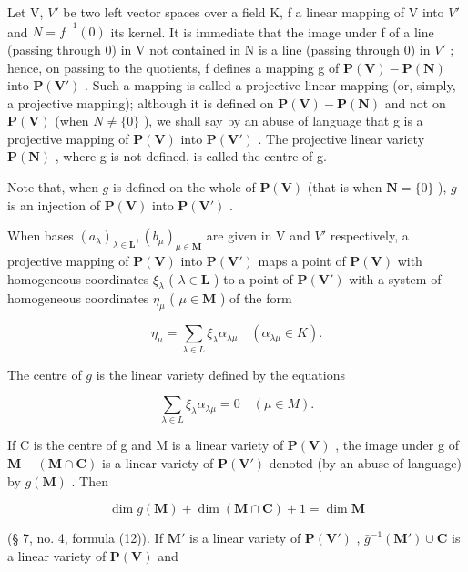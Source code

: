 Let V, \(V'\) be two left vector spaces over a field K, f a linear mapping of V into \(V'\) and \(N = \bar{f}^{-1}(0)\) its kernel. It is immediate that the image under f of a line (passing through 0) in V not contained in N is a line (passing through 0) in \(V'\) ; hence, on passing to the quotients, f defines a mapping g of \(\mathbf{P}(\mathbf{V}) - \mathbf{P}(\mathbf{N})\) into \(\mathbf{P}(\mathbf{V}')\) . Such a mapping is called a projective linear mapping (or, simply, a projective mapping); although it is defined on \(\mathbf{P}(\mathbf{V}) - \mathbf{P}(\mathbf{N})\) and not on \(\mathbf{P}(\mathbf{V})\) (when \(N \neq \{0\}\) ), we shall say by an abuse of language that g is a projective mapping of \(\mathbf{P}(\mathbf{V})\) into \(\mathbf{P}(\mathbf{V}')\) . The projective linear variety \(\mathbf{P}(\mathbf{N})\) , where g is not defined, is called the centre of g.

Note that, when \(g\) is defined on the whole of \(\mathbf{P}(\mathbf{V})\) (that is when \(\mathbf{N} = \{0\}\) ), \(g\) is an injection of \(\mathbf{P}(\mathbf{V})\) into \(\mathbf{P}(\mathbf{V}')\) .

When bases \((a_{\lambda})_{\lambda\in\mathbf{L}}, (b_{\mu})_{\mu\in\mathbf{M}}\) are given in V and \(V'\) respectively, a projective mapping of \(\mathbf{P}(\mathbf{V})\) into \(\mathbf{P}(\mathbf{V}')\) maps a point of \(\mathbf{P}(\mathbf{V})\) with homogeneous coordinates \(\xi_{\lambda}\) ( \(\lambda \in \mathbf{L}\) ) to a point of \(\mathbf{P}(\mathbf{V}')\) with a system of homogeneous coordinates \(\eta_{\mu}\) ( \(\mu \in \mathbf{M}\) ) of the form

\[
\eta_ {\mu} = \sum_ {\lambda \in L} \xi_ {\lambda} \alpha_ {\lambda \mu} \quad (\alpha_ {\lambda \mu} \in K).\tag{6}
\]

The centre of \(g\) is the linear variety defined by the equations

\[
\sum_ {\lambda \in L} \xi_ {\lambda} \alpha_ {\lambda \mu} = 0 \quad (\mu \in M).
\]

If C is the centre of g and M is a linear variety of \(\mathbf{P}(\mathbf{V})\) , the image under g of \(\mathbf{M} - (\mathbf{M} \cap \mathbf{C})\) is a linear variety of \(\mathbf{P}(\mathbf{V}')\) denoted (by an abuse of language) by \(g(\mathbf{M})\) . Then

\[
\dim g (\mathbf {M}) + \dim (\mathbf {M} \cap \mathbf {C}) + 1 = \dim \mathbf {M}\tag{7}
\]

(§ 7, no. 4, formula (12)). If \(\mathbf{M}'\) is a linear variety of \(\mathbf{P}(\mathbf{V}')\) , \(\bar{g}^{-1}(\mathbf{M}') \cup \mathbf{C}\) is a linear variety of \(\mathbf{P}(\mathbf{V})\) and

